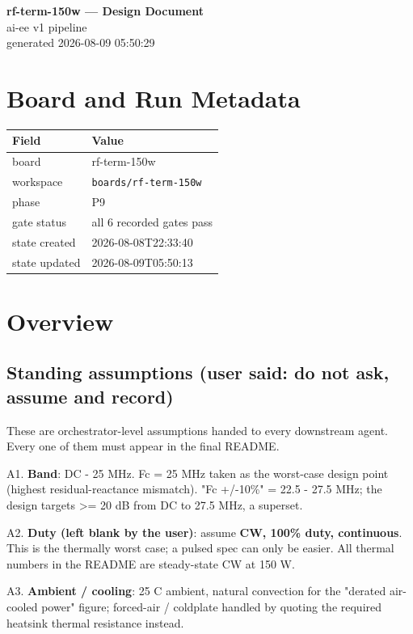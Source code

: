 \documentclass[11pt,a4paper]{article}
\begin{document}
\sloppy
\begin{center}
{\LARGE\bfseries rf-term-150w --- Design Document}\\[6pt]
{\large ai-ee v1 pipeline}\\[2pt]
generated 2026-08-09 05:50:29
\end{center}
\tableofcontents

\section{Board and Run Metadata}
{\small
\begin{longtable}{lp{11cm}}
\toprule
\textbf{Field} & \textbf{Value} \\
\midrule
\endhead
board & rf-term-150w \\
workspace & \texttt{boards/rf-term-150w} \\
phase & P9 \\
gate status & all 6 recorded gates pass \\
state created & 2026-08-08T22:33:40 \\
state updated & 2026-08-09T05:50:13 \\
\bottomrule
\end{longtable}
}
\section{Overview}
\subsection*{Standing assumptions (user said: do not ask, assume and record)}
These are orchestrator-level assumptions handed to every downstream agent. Every one of them must appear in the final README.

A1. \textbf{Band}: DC - 25 MHz. Fc = 25 MHz taken as the worst-case design point (highest residual-reactance mismatch). "Fc +/-10\%" = 22.5 - 27.5 MHz; the design targets \textgreater{}= 20 dB from DC to 27.5 MHz, a superset.

A2. \textbf{Duty (left blank by the user)}: assume \textbf{CW, 100\% duty, continuous}. This is the thermally worst case; a pulsed spec can only be easier. All thermal numbers in the README are steady-state CW at 150 W.

A3. \textbf{Ambient / cooling}: 25 C ambient, natural convection for the "derated air-cooled power" figure; forced-air / coldplate handled by quoting the required heatsink thermal resistance instead.
\end{document}
